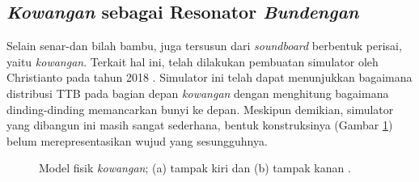 \subsection{\textit{Kowangan} sebagai Resonator \textit{Bundengan}}\label{sub-subBab:kowanganResonator}
Selain senar-\bandul dan bilah bambu, \bundengan juga tersusun dari \textit{soundboard} berbentuk perisai, yaitu \textit{kowangan}. Terkait hal ini, telah dilakukan pembuatan simulator oleh Christianto pada tahun 2018 \cite{skripsiRaymond}. Simulator ini telah dapat menunjukkan bagaimana distribusi TTB pada bagian depan \textit{kowangan} dengan menghitung bagaimana dinding-dinding \kowangan memancarkan bunyi ke depan. Meskipun demikian, simulator yang dibangun ini masih sangat sederhana, bentuk konstruksinya (Gambar \ref{fig:modelKowanganRaymond}) belum merepresentasikan wujud \kowangan yang sesungguhnya. \par 
\begin{figure}[t!]
    \centering
    \hspace{1 cm}
    \caption{Model fisik \textit{kowangan}; (a) tampak kiri dan (b) tampak kanan \cite{skripsiRaymond}.}
    \label{fig:modelKowanganRaymond}
\end{figure}
